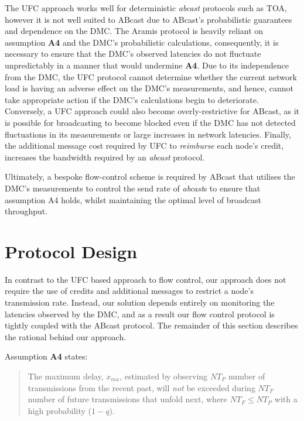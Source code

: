 The \textsf{UFC} approach works well for deterministic \emph{abcast} protocols such as TOA, however it is not well suited to \textsf{ABcast} due to \textsf{ABcast}'s probabilistic guarantees and dependence on the DMC.  The \textsf{Aramis} protocol is heavily reliant on assumption \textbf{A4} and the DMC's probabilistic calculations, consequently, it is necessary to ensure that the DMC's observed latencies do not fluctuate unpredictably in a manner that would undermine \textbf{A4}.  Due to its independence from the DMC, the \textsf{UFC} protocol cannot determine whether the current network load is having an adverse effect on the DMC's measurements,  and hence, cannot take appropriate action if the DMC's calculations begin to deteriorate.  Conversely, a \textsf{UFC} approach could also become overly-restrictive for \textsf{ABcast}, as it is possible for broadcasting to become blocked even if the DMC has not detected fluctuations in its measurements or large increases in network latencies.  Finally, the additional message cost required by \textsf{UFC} to \emph{reimburse} each node's credit, increases the bandwidth required by an \emph{abcast} protocol.  

Ultimately, a bespoke flow-control scheme is required by \textsf{ABcast} that utilises the DMC's measurements to control the send rate of \emph{abcast}s to ensure that assumption A4 holds, whilst maintaining the optimal level of broadcast throughput.  

\section{Protocol Design}
    In contrast to the \textsf{UFC} based approach to flow control, our approach does not require the use of credits and additional messages to restrict a node's transmission rate.  Instead, our solution depends entirely on monitoring the latencies observed by the DMC, and as a result our flow control protocol is tightly coupled with the \textsf{ABcast} protocol.  The remainder of this section describes the rational behind our approach.  
    
    Assumption \textbf{A4} states:
    
    \begin{quotation}
            The maximum delay, $x_{mx}$, estimated by observing $NT_P$ number of transmissions from the recent past, will \emph{not} be exceeded during $NT_F$ number of future transmissions that unfold next, where $NT_F \leq NT_P$ with a high probability ($1 - q$).
        \end{quotation}
    
